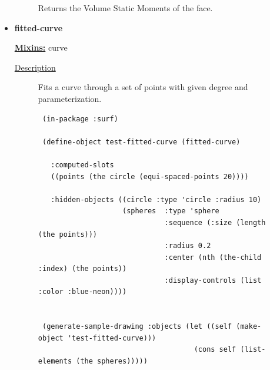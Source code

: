 \documentclass [11pt]{book}
\begin{document}
\begin{itemize}
\begin{description}
 Returns the Volume Static Moments of the face.




\end{description}







\item {}
\label{prim:fitted-curve}
\textbf{fitted-curve}


\textbf{
\underline{Mixins:}} curve





\begin{description}

\item [
\underline{Description}]


Fits a curve through a set of points with given degree 
and parameterization.



\end{description}




\begin{figure}
\begin{lrbox}{\boxedverb}
\begin{minipage}{\linewidth}
{\small

\begin{verbatim}
 (in-package :surf)

 (define-object test-fitted-curve (fitted-curve) 
  
   :computed-slots
   ((points (the circle (equi-spaced-points 20))))

   :hidden-objects ((circle :type 'circle :radius 10)
                    (spheres  :type 'sphere
                              :sequence (:size (length (the points)))
                              :radius 0.2
                              :center (nth (the-child :index) (the points))
                              :display-controls (list :color :blue-neon))))


 (generate-sample-drawing :objects (let ((self (make-object 'test-fitted-curve)))
                                     (cons self (list-elements (the spheres)))))


 
\end{verbatim}}
\end{minipage}
\end{lrbox}
\fbox{\usebox{\boxedverb}}


\end{figure}
\end{itemize}
\end{document}
